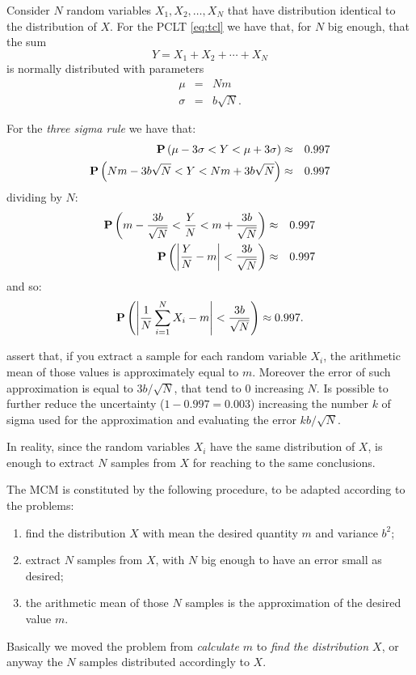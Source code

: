 \documentclass[dissertation.tex]{subfiles}
\begin{document}
Consider $N$ random variables $X_1,X_2,\dots,X_N$ that have
distribution identical to the distribution of $X$. For the \ac{PCLT}
\cref{eq:tcl} we have that, for $N$ big enough, that the sum
\begin{equation*}
  Y=X_1+X_2+\cdots+X_N
\end{equation*}
is normally distributed with parameters
\begin{eqnarray*}
  \mu &=& Nm\\
  \sigma&=&b\sqrt{N}.
\end{eqnarray*}

For the \emph{three sigma rule} we have that:
\begin{eqnarray*}
  \mathrm{\textbf{P}}\left(\mu-3\sigma < Y <\mu +3\sigma\right)&\approx& 0.997\\
  \mathrm{\textbf{P}}\left(Nm-3b\sqrt{N} < Y < Nm+3b\sqrt{N}\right)&\approx& 0.997
\end{eqnarray*}
dividing by $N$:
\begin{eqnarray*}
  \mathrm{\textbf{P}}\left(m-\frac{3b}{\sqrt{N}} < \frac{Y}{N} <
    m+\frac{3b}{\sqrt{N}}\right)&\approx& 0.997\\
  \mathrm{\textbf{P}}\left(\left|\frac{Y}{N}-m\right| <\frac{3b}{\sqrt{N}}\right)&\approx& 0.997
\end{eqnarray*}
and so:
\begin{equation}\label{eq:mc}
  \mathrm{\textbf{P}}\left(\left|\frac{1}{N}\sum_{i=1}^NX_i-m\right| <\frac{3b}{\sqrt{N}}\right)\approx 0.997.
\end{equation}

 assert that, if you extract a sample for each random
variable $X_i$, the arithmetic mean of those values is approximately
equal to $m$. Moreover the error of such approximation is equal to
$3b/\sqrt{N}$, that tend to $0$ increasing $N$. Is possible to further
reduce the uncertainty ($1-0.997=0.003$) increasing the number $k$ of
sigma used for the
approximation and evaluating the error $kb/\sqrt{N}$.

In reality, since the random variables $X_i$ have the same
distribution of $X$, is enough to extract $N$ samples from $X$ for
reaching to the same conclusions.

The \ac{MCM} is constituted by the following procedure, to be adapted
according to the problems:
\begin{enumerate}
\item find the distribution $X$ with mean the desired quantity $m$ and
  variance $b^2$;
\item extract $N$ samples from $X$, with $N$ big enough to have an
  error small as desired;
\item the arithmetic mean of those $N$ samples is the approximation of
  the desired value $m$.
\end{enumerate}
Basically we moved the problem from \emph{calculate $m$} to \emph{find
  the distribution $X$}, or anyway the $N$ samples distributed
accordingly to $X$.
\end{document}
